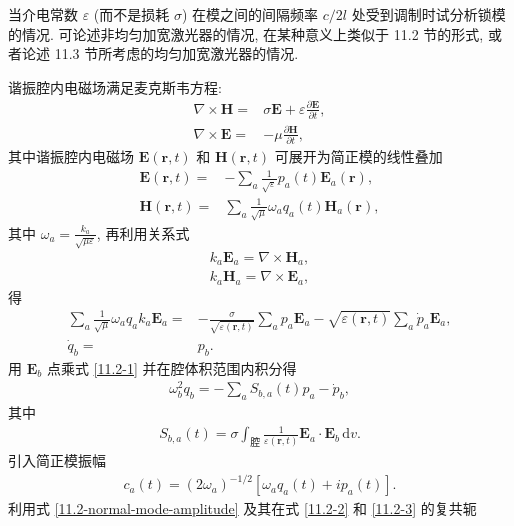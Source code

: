 \documentclass[twoside]{note}
\begin{document}
\begin{exe}
    当介电常数 $\varepsilon$ (而不是损耗 $\sigma$) 在模之间的间隔频率 $c/2l$ 处受到调制时试分析锁模的情况. 可论述非均匀加宽激光器的情况, 在某种意义上类似于 11.2 节的形式, 或者论述 11.3 节所考虑的均匀加宽激光器的情况.
\end{exe}
\begin{sol}
    谐振腔内电磁场满足麦克斯韦方程:
    \begin{align}
        \nabla\times\bm{H}=&\sigma \bm{E}+\varepsilon\frac{\partial\bm{E}}{\partial t},\\
        \nabla\times\bm{E}=&-\mu\frac{\partial\bm{H}}{\partial t},
    \end{align}
    其中谐振腔内电磁场 $\bm{E}(\bm{r},t)$ 和 $\bm{H}(\bm{r},t)$ 可展开为简正模的线性叠加
    \begin{align}
        \bm{E}(\bm{r},t)=&-\sum_a\frac{1}{\sqrt{\varepsilon}}p_a(t)\bm{E}_a(\bm{r}),\\
        \bm{H}(\bm{r},t)=&\sum_a\frac{1}{\sqrt{\mu}}\omega_aq_a(t)\bm{H}_a(\bm{r}),
    \end{align}
    其中 $\omega_a=\frac{k_a}{\sqrt{\mu\varepsilon}}$,
    再利用关系式
    \begin{align}
        k_a\bm{E}_a=\nabla\times\bm{H}_a,\\
        k_a\bm{H}_a=\nabla\times\bm{E}_a,
    \end{align}
    得
    \begin{align}
        \label{11.2-1}
        \sum_a\frac{1}{\sqrt{\mu}}\omega_aq_ak_a\bm{E}_a=&-\frac{\sigma}{\sqrt{\varepsilon(\bm{r},t)}}\sum_ap_a\bm{E}_a-\sqrt{\varepsilon(\bm{r},t)}\sum_a\dot{p}_a\bm{E}_a,\\
        \label{11.2-2}
        \dot{q}_b=&p_b.
    \end{align}
    用 $\bm{E}_b$ 点乘式 \eqref{11.2-1} 并在腔体积范围内积分得
    \begin{align}
        \label{11.2-3}
        \omega_b^2q_b=-\sum_aS_{b,a}(t)p_a-\dot{p}_b,
    \end{align}
    其中
    \begin{align}
        \label{11.2-4}
        S_{b,a}(t)=\sigma\int_{\text{腔}}\frac{1}{\varepsilon(\bm{r},t)}\bm{E}_a\cdot\bm{E}_b\,\mathrm{d}v.
    \end{align}
    引入简正模振幅
    \begin{align}
        \label{11.2-normal-mode-amplitude}
        c_a(t)=(2\omega_a)^{-1/2}[\omega_aq_a(t)+ip_a(t)].
    \end{align}
    利用式 \eqref{11.2-normal-mode-amplitude} 及其在式 \eqref{11.2-2} 和 \eqref{11.2-3} 的复共轭

\end{sol}
\end{document}
